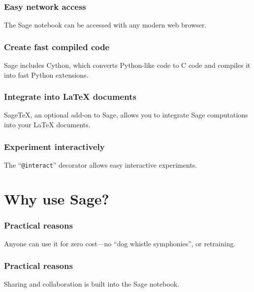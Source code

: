 \documentclass{beamer}
\begin{document}
\begin{frame}
  \frametitle{Easy network access}
  
  The Sage notebook can be accessed with any modern web browser.


\end{frame}

\begin{frame}
  \frametitle{Create fast compiled code}
  
  Sage includes Cython, which converts Python-like code to C code and
  compiles it into fast Python extensions.


\end{frame}

\begin{frame}
  \frametitle{Integrate into \LaTeX{} documents}
  
  Sage\TeX{}, an optional add-on to Sage, allows you to integrate Sage
  computations into your \LaTeX{} documents.


\end{frame}

\begin{frame}
  \frametitle{Experiment interactively}

  The ``\texttt{@interact}'' decorator allows easy interactive
  experiments.

  
\end{frame}

\section{Why use Sage?}

\begin{frame}
  \frametitle{Practical reasons}

  Anyone can use it for zero cost---no ``dog whistle symphonies'',
  or retraining.

  
\end{frame}

\begin{frame}
  \frametitle{Practical reasons}

  Sharing and collaboration is built into the Sage notebook.

\end{frame}
\end{document}
